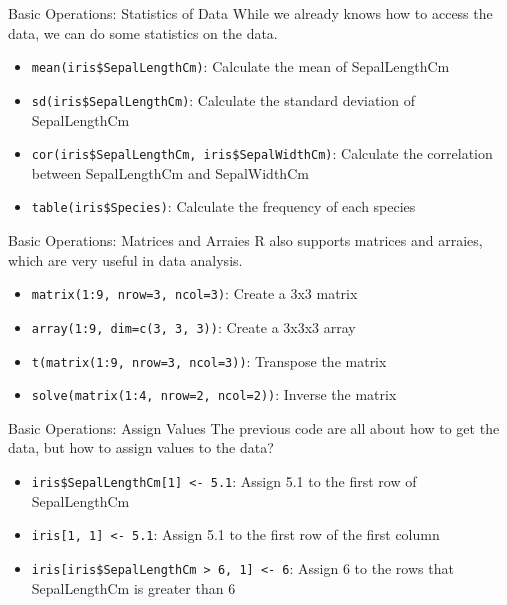 \documentclass[aspectratio=169]{beamer}
\begin{document}
    \begin{frame}{Basic Operations: Statistics of Data}
        While we already knows how to access the data, we can do some statistics on the data.\par
        \begin{itemize}
            \item \texttt{mean(iris\$SepalLengthCm)}: Calculate the mean of SepalLengthCm
            \item \texttt{sd(iris\$SepalLengthCm)}: Calculate the standard deviation of SepalLengthCm
            \item \texttt{cor(iris\$SepalLengthCm, iris\$SepalWidthCm)}: Calculate the correlation between SepalLengthCm and SepalWidthCm
            \item \texttt{table(iris\$Species)}: Calculate the frequency of each species
        \end{itemize}
    \end{frame}

    \begin{frame}{Basic Operations: Matrices and Arraies}
        R also supports matrices and arraies, which are very useful in data analysis.\par
        \begin{itemize}
            \item \texttt{matrix(1:9, nrow=3, ncol=3)}: Create a 3x3 matrix
            \item \texttt{array(1:9, dim=c(3, 3, 3))}: Create a 3x3x3 array
            \item \texttt{t(matrix(1:9, nrow=3, ncol=3))}: Transpose the matrix
            \item \texttt{solve(matrix(1:4, nrow=2, ncol=2))}: Inverse the matrix
        \end{itemize}
    \end{frame}

    \begin{frame}{Basic Operations: Assign Values}
        The previous code are all about how to get the data, but how to assign values to the data?\par
        \begin{itemize}
            \item \texttt{iris\$SepalLengthCm[1] <- 5.1}: Assign 5.1 to the first row of SepalLengthCm
            \item \texttt{iris[1, 1] <- 5.1}: Assign 5.1 to the first row of the first column
            \item \texttt{iris[iris\$SepalLengthCm > 6, 1] <- 6}: Assign 6 to the rows that SepalLengthCm is greater than 6
        \end{itemize}
    \end{frame}
\end{document}

